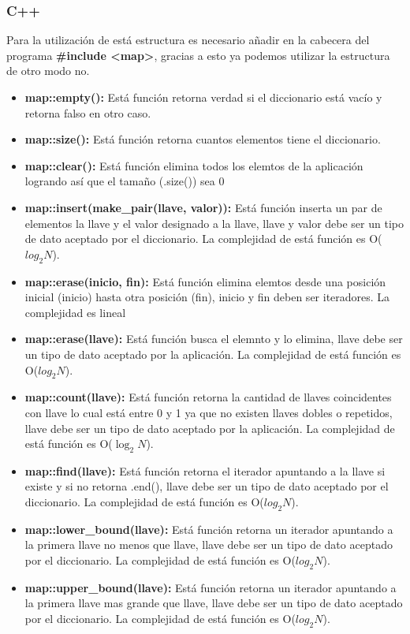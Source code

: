 \subsubsection{C++}

Para la utilización de está estructura es necesario añadir en la cabecera del programa \textbf{\#include <map>}, gracias a esto ya podemos utilizar la estructura de otro modo no.

\begin{itemize}
	\item \textbf{map::empty():} Está función retorna verdad si el diccionario está vacío y retorna falso en otro caso.
	\item \textbf{map::size():} Está función retorna cuantos elementos tiene el diccionario.
	\item \textbf{map::clear():} Está función elimina todos los elemtos de la aplicación logrando así
	que el tamaño (.size()) sea 0
	\item \textbf{map::insert(make\_pair(llave,
valor)):} Está función inserta un par de elementos la llave y el valor designado
a la llave, llave y valor debe ser un tipo de dato aceptado por el diccionario. La complejidad de está función es O($log_2 N$).
	\item \textbf{map::erase(inicio, fin):} Está función elimina elemtos desde una posición inicial (inicio) hasta
otra posición (fin), inicio y fin deben ser iteradores. La complejidad
es lineal
	\item \textbf{map::erase(llave):} Está función busca el elemnto y lo elimina, llave debe ser un tipo de
dato aceptado por la aplicación. La complejidad de está función es
O($log_2 N$).
	\item \textbf{map::count(llave):} Está función retorna la cantidad de llaves coincidentes con llave lo cual
está entre 0 y 1 ya que no existen llaves dobles o repetidos, llave debe
ser un tipo de dato aceptado por la aplicación. La complejidad de está
función es O($\log_2 N$).
	\item \textbf{map::find(llave):} Está función retorna el iterador apuntando a la llave si existe y si no
retorna .end(), llave debe ser un tipo de dato aceptado por el diccionario.
La complejidad de está función es O($log_2 N$).
	\item \textbf{map::lower\_bound(llave):} Está función retorna un iterador apuntando a la primera llave no menos
que llave, llave debe ser un tipo de dato aceptado por el diccionario. La
complejidad de está función es O($log_2 N$).
	\item \textbf{map::upper\_bound(llave):} Está función retorna un iterador apuntando a la primera llave mas grande
que llave, llave debe ser un tipo de dato aceptado por el diccionario. La complejidad de está función es O($log_2 N$).
\end{itemize}

